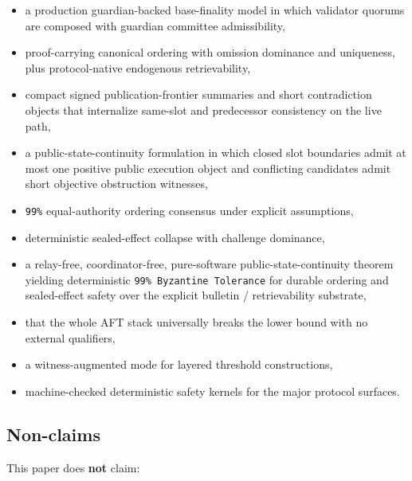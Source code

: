 \documentclass[11pt]{article}
\newcommand{\AFT}{\textsc{AFT}}
\newcommand{\code}[1]{\texttt{#1}}
\begin{document}
\begin{itemize}[leftmargin=1.5em]
\item a production guardian-backed base-finality model in which validator
quorums are composed with guardian committee admissibility,
\item proof-carrying canonical ordering with omission dominance and uniqueness,
plus protocol-native endogenous retrievability,
\item compact signed publication-frontier summaries and short contradiction
objects that internalize same-slot and predecessor consistency on the live
path,
\item a public-state-continuity formulation in which closed slot boundaries
admit at most one positive public execution object and conflicting candidates
admit short objective obstruction witnesses,
\item \code{99\%} equal-authority ordering consensus under explicit
assumptions,
\item deterministic sealed-effect collapse with challenge dominance,
\item a relay-free, coordinator-free, pure-software public-state-continuity
theorem yielding deterministic \code{99\% Byzantine Tolerance} for durable
ordering and sealed-effect safety over the explicit bulletin /
retrievability substrate,
\item that the whole \AFT{} stack universally breaks the lower bound with no
external qualifiers,
\item a witness-augmented mode for layered threshold constructions,
\item machine-checked deterministic safety kernels for the major protocol
surfaces.
\end{itemize}

\subsection{Non-claims}

This paper does \textbf{not} claim:
\end{document}
